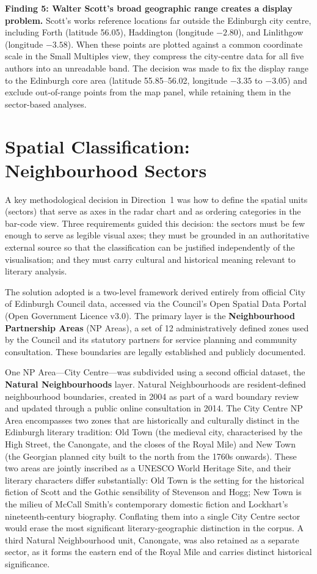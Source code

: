 \documentclass[logo,msc]{infthesis}
\begin{document}
\textbf{Finding 5: Walter Scott's broad geographic range creates a display problem.} Scott's works reference locations far outside the Edinburgh city centre, including Forth (latitude 56.05), Haddington (longitude $-2.80$), and Linlithgow (longitude $-3.58$). When these points are plotted against a common coordinate scale in the Small Multiples view, they compress the city-centre data for all five authors into an unreadable band. The decision was made to fix the display range to the Edinburgh core area (latitude 55.85--56.02, longitude $-3.35$ to $-3.05$) and exclude out-of-range points from the map panel, while retaining them in the sector-based analyses.
 
\section{Spatial Classification: Neighbourhood Sectors}
\label{sec:sectors}
 
A key methodological decision in Direction~1 was how to define the spatial units (sectors) that serve as axes in the radar chart and as ordering categories in the bar-code view. Three requirements guided this decision: the sectors must be few enough to serve as legible visual axes; they must be grounded in an authoritative external source so that the classification can be justified independently of the visualisation; and they must carry cultural and historical meaning relevant to literary analysis.
 
The solution adopted is a two-level framework derived entirely from official City of Edinburgh Council data, accessed via the Council's Open Spatial Data Portal (Open Government Licence v3.0). The primary layer is the \textbf{Neighbourhood Partnership Areas} (NP Areas), a set of 12 administratively defined zones used by the Council and its statutory partners for service planning and community consultation. These boundaries are legally established and publicly documented.
 
One NP Area---City Centre---was subdivided using a second official dataset, the \textbf{Natural Neighbourhoods} layer. Natural Neighbourhoods are resident-defined neighbourhood boundaries, created in 2004 as part of a ward boundary review and updated through a public online consultation in 2014. The City Centre NP Area encompasses two zones that are historically and culturally distinct in the Edinburgh literary tradition: Old Town (the medieval city, characterised by the High Street, the Canongate, and the closes of the Royal Mile) and New Town (the Georgian planned city built to the north from the 1760s onwards). These two areas are jointly inscribed as a UNESCO World Heritage Site, and their literary characters differ substantially: Old Town is the setting for the historical fiction of Scott and the Gothic sensibility of Stevenson and Hogg; New Town is the milieu of McCall Smith's contemporary domestic fiction and Lockhart's nineteenth-century biography. Conflating them into a single City Centre sector would erase the most significant literary-geographic distinction in the corpus. A third Natural Neighbourhood unit, Canongate, was also retained as a separate sector, as it forms the eastern end of the Royal Mile and carries distinct historical significance.
 
\end{document}
